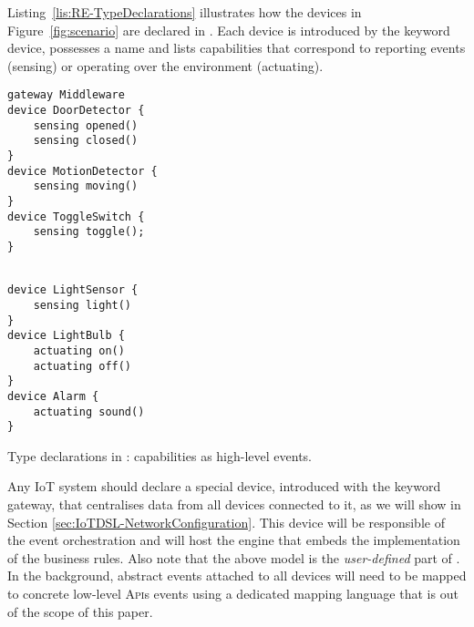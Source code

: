 Listing~\ref{lis:RE-TypeDeclarations} illustrates how the devices in Figure~\ref{fig:scenario} are declared in \IOTDSL. Each device is introduced by the keyword \textsf{device}, possesses a name and lists capabilities that correspond to reporting events (\textsf{sensing}) or operating over the environment (\textsf{actuating}). 

\begin{table}
	\begin{minipage}[b]{.45\textwidth }%
		\begin{lstlisting}[language=iotdsl]	
gateway Middleware
device DoorDetector {
	sensing opened()
	sensing closed()
}
device MotionDetector {
	sensing moving()
}
device ToggleSwitch {
	sensing toggle();
}
		\end{lstlisting}
	\end{minipage}\hfill%
	\begin{minipage}[b]{.45\textwidth}
		\begin{lstlisting}[language=iotdsl, firstnumber=12]
		
device LightSensor {
	sensing light()
}
device LightBulb {
	actuating on()
	actuating off()
}	
device Alarm {
	actuating sound()
}
		\end{lstlisting}
	\end{minipage}
	\caption{Type declarations in \IOTDSL: capabilities as high-level events.}
	\label{lis:RE-TypeDeclarations}
\end{table}

Any IoT system should declare a special device, introduced with the keyword \textsf{gateway}, that centralises data from all devices connected to it, as we will show in Section \ref{sec:IoTDSL-NetworkConfiguration}. This device will be responsible of the event orchestration and will host the \CEP engine that embeds the implementation of the business rules. Also note that the above model is the \textit{user-defined} part of \IOTDSL. In the background, abstract events attached to all devices will need to be mapped to concrete low-level \textsc{Api}s events using a dedicated mapping language that is out of the scope of this paper.

